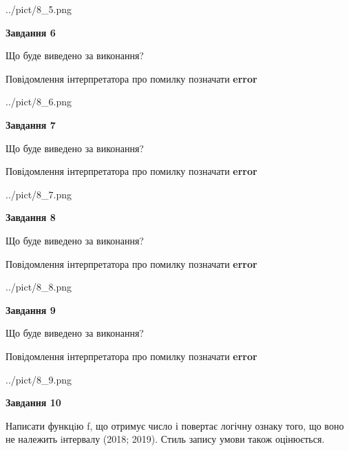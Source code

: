 \documentclass[12pt, ukrainian]{article}
\begin{document}
{\begin {large}
\begin{center}
	{../pict/8_5.png}
\end{center}
\newpage

{\begin {center}\textbf{Завдання 6}\end {center}}\par
Що буде виведено за виконання? \par
Повідомлення інтерпретатора про помилку позначати \textbf{error}

\begin{center}
	{../pict/8_6.png}
\end{center}
\newpage

{\begin {center}\textbf{Завдання 7}\end {center}}\par
Що буде виведено за виконання? \par
Повідомлення інтерпретатора про помилку позначати \textbf{error}

\begin{center}
	{../pict/8_7.png}
\end{center}
\newpage

{\begin {center}\textbf{Завдання 8}\end {center}}\par
Що буде виведено за виконання? \par
Повідомлення інтерпретатора про помилку позначати \textbf{error}

\begin{center}
	{../pict/8_8.png}
\end{center}
\newpage

{\begin {center}\textbf{Завдання 9}\end {center}}\par
Що буде виведено за виконання? \par
Повідомлення інтерпретатора про помилку позначати \textbf{error}

\begin{center}
	{../pict/8_9.png}
\end{center}
\newpage

{\begin {center}\textbf{Завдання 10}\end {center}}\par

Написати функцiю f, що отримує число і повертає логічну ознаку того, що воно не належить iнтервалу (2018; 2019). Стиль запису умови також оцінюється.\par
\newpage

\end {large}}
\end{document}
